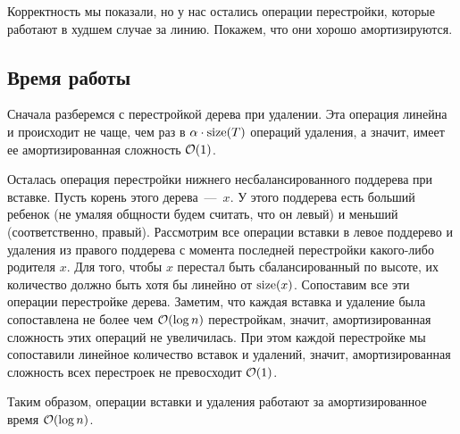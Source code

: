Корректность мы показали, но у нас остались операции перестройки, которые работают в худшем случае за линию. Покажем, что они хорошо амортизируются.

\subsection{Время работы}

Сначала разберемся с перестройкой дерева при удалении. Эта операция линейна и происходит не чаще, чем раз в $\alpha \cdot \operatorname{size}(T)$ операций удаления, а значит, имеет ее амортизированная сложность $\mathcal{O}(1)$.

Осталась операция перестройки нижнего несбалансированного поддерева при вставке. Пусть корень этого дерева~---~$x$. У этого поддерева есть больший ребенок (не умаляя общности будем считать, что он левый) и меньший (соответственно, правый). Рассмотрим все операции вставки в левое поддерево и удаления из правого поддерева с момента последней перестройки какого-либо родителя $x$. Для того, чтобы $x$ перестал быть сбалансированный по высоте, их количество должно быть хотя бы линейно от $\operatorname{size}(x)$. Сопоставим все эти операции перестройке дерева. Заметим, что каждая вставка и удаление была сопоставлена не более чем $\mathcal{O}(\log n)$ перестройкам, значит, амортизированная сложность этих операций не увеличилась. При этом каждой перестройке мы сопоставили линейное количество вставок и удалений, значит, амортизированная сложность всех перестроек не превосходит $\mathcal{O}(1)$.

Таким образом, операции вставки и удаления работают за амортизированное время $\mathcal{O}(\log n)$.
